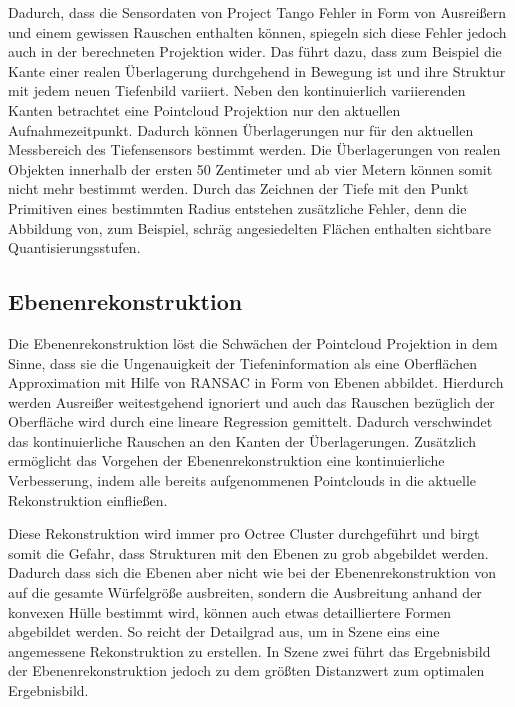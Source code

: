 Dadurch, dass die Sensordaten von Project Tango Fehler in Form von Ausreißern und einem gewissen Rauschen enthalten können, spiegeln sich diese Fehler jedoch auch in der berechneten Projektion wider. Das führt dazu, dass zum Beispiel die Kante einer realen Überlagerung durchgehend in Bewegung ist und ihre Struktur mit jedem neuen Tiefenbild variiert. Neben den kontinuierlich variierenden Kanten betrachtet eine Pointcloud Projektion nur den aktuellen Aufnahmezeitpunkt. Dadurch können Überlagerungen nur für den aktuellen Messbereich des Tiefensensors bestimmt werden. Die Überlagerungen von realen Objekten innerhalb der ersten 50 Zentimeter und ab vier Metern können somit nicht mehr bestimmt werden. Durch das Zeichnen der Tiefe mit den Punkt Primitiven eines bestimmten Radius entstehen zusätzliche Fehler, denn die Abbildung von, zum Beispiel, schräg angesiedelten Flächen enthalten sichtbare Quantisierungsstufen.

\subsection*{Ebenenrekonstruktion}

Die Ebenenrekonstruktion löst die Schwächen der Pointcloud Projektion in dem Sinne, dass sie die Ungenauigkeit der Tiefeninformation als eine Oberflächen Approximation mit Hilfe von RANSAC in Form von Ebenen abbildet. Hierdurch werden Ausreißer weitestgehend ignoriert und auch das Rauschen bezüglich der Oberfläche wird durch eine lineare Regression gemittelt. Dadurch verschwindet das kontinuierliche Rauschen an den Kanten der Überlagerungen. Zusätzlich ermöglicht das Vorgehen der Ebenenrekonstruktion eine kontinuierliche Verbesserung, indem alle bereits aufgenommenen Pointclouds in die aktuelle Rekonstruktion einfließen. 

Diese Rekonstruktion wird immer pro Octree Cluster durchgeführt und birgt somit die Gefahr, dass Strukturen mit den Ebenen zu grob abgebildet werden. Dadurch dass sich die Ebenen aber nicht wie bei der Ebenenrekonstruktion von \citet{yang2010plane} auf die gesamte Würfelgröße ausbreiten, sondern die Ausbreitung anhand der konvexen Hülle bestimmt wird, können auch etwas detailliertere Formen abgebildet werden. So reicht der Detailgrad aus, um in Szene eins eine angemessene Rekonstruktion zu erstellen. In Szene zwei führt das Ergebnisbild der Ebenenrekonstruktion jedoch zu dem größten Distanzwert zum optimalen Ergebnisbild.

